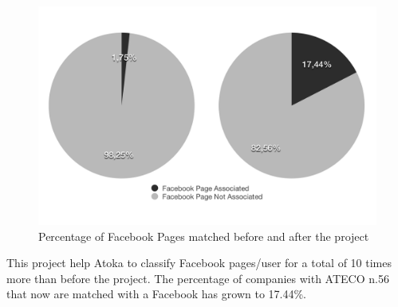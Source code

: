 \begin{figure}
\centering
    \includegraphics[width=0.5\columnwidth]{img/confronto_bw.png}
    \caption{Percentage of Facebook Pages matched before and after the project}
    \label{Fig.6}
\end{figure}

This project help Atoka to classify Facebook pages/user for a total of 10 times more than before the project. The percentage of companies with ATECO n.56 that now are matched with a Facebook has grown to 17.44\%.

